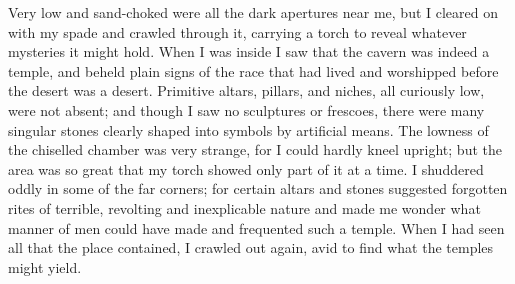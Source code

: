 ﻿\documentclass{article}
\begin{document}
Very low and sand-choked were all the dark apertures near me, but I cleared on
with my spade and crawled through it, carrying a torch to reveal whatever
mysteries it might hold. When I was inside I saw that the cavern was indeed a
temple, and beheld plain signs of the race that had lived and worshipped before
the desert was a desert. Primitive altars, pillars, and niches, all curiously
low, were not absent; and though I saw no sculptures or frescoes, there were
many singular stones clearly shaped into symbols by artificial means. The
lowness of the chiselled chamber was very strange, for I could hardly kneel
upright; but the area was so great that my torch showed only part of it at a
time. I shuddered oddly in some of the far corners; for certain altars and
stones suggested forgotten rites of terrible, revolting and inexplicable nature
and made me wonder what manner of men could have made and frequented such a
temple. When I had seen all that the place contained, I crawled out again, avid
to find what the temples might yield.
\end{document}
